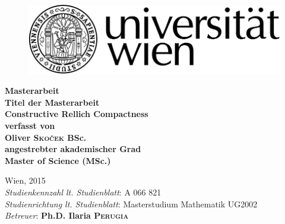 \documentclass[11pt,a4paper,leqno]{report}
\numberwithin{equation}{chapter}
\begin{document}
\begin{titlepage}
\begin{figure}[H]
\begin{flushright}
	 \includegraphics{RZ_Logo_Uni_sw_01.jpg}
\end{flushright}
\end{figure}

\begin{center}
\Huge\bfseries Masterarbeit\\[3cm]
\small
Titel der Masterarbeit\\[0.3cm]

\huge\bfseries Constructive Rellich Compactness\\[3cm]
\small
verfasst von\\[0.3cm]
Oliver \textsc{Sko\v{c}ek} BSc.\\[2cm]
angestrebter akademischer Grad\\[0.3cm]
Master of Science (MSc.)

\end{center}
\begin{flushleft}
Wien, 2015\\[1cm]
\small
\emph{Studienkennzahl lt. Studienblatt}: A 066 821 \\[0.3cm]
\small
\emph{Studienrichtung lt. Studienblatt}: Masterstudium Mathematik UG2002\\[0.5cm]
\normalsize
\emph{Betreuer}: \bfseries Ph.D. Ilaria \textsc{Perugia}
\end{flushleft}

 
 
\end{titlepage}



\end{document}
